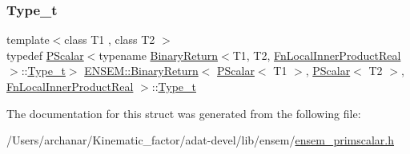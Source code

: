 \subsubsection{\texorpdfstring{Type\_t}{Type\_t}\hspace{0.1cm}{\footnotesize\ttfamily [3/3]}}
{\footnotesize\ttfamily template$<$class T1 , class T2 $>$ \\
typedef \mbox{\hyperlink{classENSEM_1_1PScalar}{P\+Scalar}}$<$typename \mbox{\hyperlink{structENSEM_1_1BinaryReturn}{Binary\+Return}}$<$T1, T2, \mbox{\hyperlink{structENSEM_1_1FnLocalInnerProductReal}{Fn\+Local\+Inner\+Product\+Real}}$>$\+::\mbox{\hyperlink{structENSEM_1_1BinaryReturn_3_01PScalar_3_01T1_01_4_00_01PScalar_3_01T2_01_4_00_01FnLocalInnerProductReal_01_4_a1e6f8209d4c022351d48a99ad43d8e72}{Type\+\_\+t}}$>$ \mbox{\hyperlink{structENSEM_1_1BinaryReturn}{E\+N\+S\+E\+M\+::\+Binary\+Return}}$<$ \mbox{\hyperlink{classENSEM_1_1PScalar}{P\+Scalar}}$<$ T1 $>$, \mbox{\hyperlink{classENSEM_1_1PScalar}{P\+Scalar}}$<$ T2 $>$, \mbox{\hyperlink{structENSEM_1_1FnLocalInnerProductReal}{Fn\+Local\+Inner\+Product\+Real}} $>$\+::\mbox{\hyperlink{structENSEM_1_1BinaryReturn_3_01PScalar_3_01T1_01_4_00_01PScalar_3_01T2_01_4_00_01FnLocalInnerProductReal_01_4_a1e6f8209d4c022351d48a99ad43d8e72}{Type\+\_\+t}}}



The documentation for this struct was generated from the following file\+:\begin{DoxyCompactItemize}
\item 
/\+Users/archanar/\+Kinematic\+\_\+factor/adat-\/devel/lib/ensem/\mbox{\hyperlink{adat-devel_2lib_2ensem_2ensem__primscalar_8h}{ensem\+\_\+primscalar.\+h}}\end{DoxyCompactItemize}
